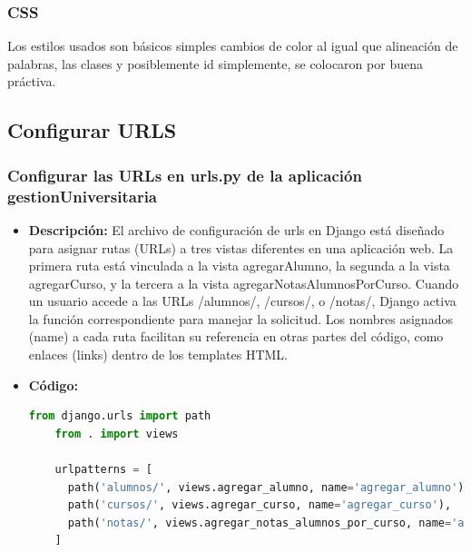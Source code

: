 \documentclass{article}
\begin{document}

  \subsubsection{CSS} 
  Los estilos usados son básicos simples cambios de color al igual que alineación de palabras, las clases y posiblemente id simplemente,
  se colocaron por buena práctiva.
  

  \subsection{Configurar URLS}
  

  \subsubsection{Configurar las URLs en urls.py de la aplicación gestionUniversitaria}
  \begin{itemize}
    \item \textbf{Descripción: }El archivo de configuración de urls en Django está diseñado para asignar rutas (URLs) a 
    tres vistas diferentes en una aplicación web. La primera ruta está vinculada a la vista agregarAlumno, la segunda a la vista 
    agregarCurso, y la tercera a la vista agregarNotasAlumnosPorCurso. Cuando un usuario accede a las URLs /alumnos/, /cursos/, 
    o /notas/, Django activa la función correspondiente para manejar la solicitud. Los nombres asignados (name) a cada ruta 
    facilitan su referencia en otras partes del código, como enlaces (links) dentro de los templates HTML.
    \item \textbf{Código: }
    \begin{lstlisting}[language=python, caption={urls.py de la App}]
    from django.urls import path
    from . import views

    urlpatterns = [
      path('alumnos/', views.agregar_alumno, name='agregar_alumno'),
      path('cursos/', views.agregar_curso, name='agregar_curso'),
      path('notas/', views.agregar_notas_alumnos_por_curso, name='agregar_nota'),
    ]
    \end{lstlisting}
  \end{itemize}
  
\end{document}
